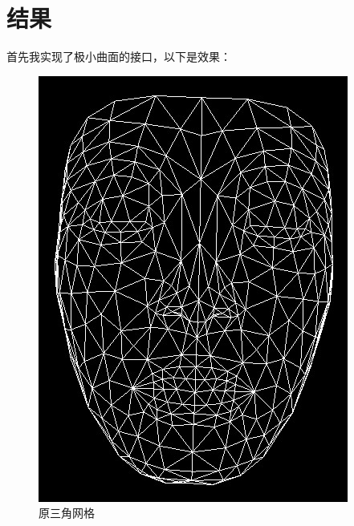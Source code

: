 \documentclass{article}
\begin{document}
	\section{结果}
	首先我实现了极小曲面的接口，以下是效果：
	\begin{figure}[htbp]
		\centering
		\begin{minipage}{0.49\linewidth}
			\centering
			\includegraphics[width=0.9\linewidth]{init.JPG}
			\caption{原三角网格}
		\end{minipage}
		\begin{minipage}{0.49\linewidth}
			\centering

\end{minipage}
\end{figure}
\end{document}
